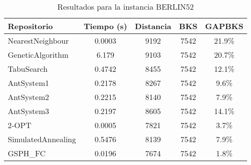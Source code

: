 \begin{table}[H]
\centering
\caption{Resultados para la instancia BERLIN52}
\begin{tabular}{|l|c|c|c|c|}
\hline
\textbf{Repositorio} & \textbf{Tiempo (s)} & \textbf{Distancia} & \textbf{BKS} & \textbf{GAPBKS} \\ 
\hline
NearestNeighbour & 0.0003 & 9192 & 7542 & 21.9\% \\ 
GeneticAlgorithm & 6.179 & 9103 & 7542 & 20.7\% \\ 
TabuSearch & 0.4742 & 8455 & 7542 & 12.1\% \\ 
AntSystem1 & 0.2178 & 8267 & 7542 & 9.6\% \\ 
AntSystem2 & 0.2215 & 8140 & 7542 & 7.9\% \\ 
AntSystem3 & 0.2197 & 8605 & 7542 & 14.1\% \\ 
2-OPT & 0.0005 & 7821 & 7542 & 3.7\% \\ 
SimulatedAnnealing & 0.5476 & 8139 & 7542 & 7.9\% \\ 
GSPH_FC & 0.0196 & 7674 & 7542 & 1.8\% \\ 
\hline
\end{tabular}
\end{table}

